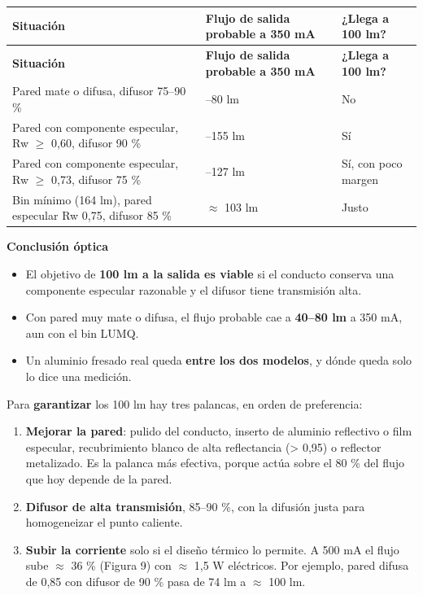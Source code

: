 \documentclass[11pt,a4paper]{article}
\newenvironment{notainferencia}[1]
  {\begin{notainferenciabase}{\sffamily\scriptsize\bfseries\color{green}#1}\par\vspace{2pt}}
  {\end{notainferenciabase}}
\begin{document}
\begingroup\footnotesize
\setlength{\tabcolsep}{4pt}
\setlength{\emergencystretch}{4em}
 
\begin{longtable}{@{}>{\RaggedRight\arraybackslash}p{}>{\RaggedRight\arraybackslash}p{}>{\RaggedRight\arraybackslash}p{}@{}}
\toprule
\scriptsize\textbf{Situación} & \scriptsize\textbf{Flujo de salida probable a 350 mA} & \scriptsize\textbf{¿Llega a 100 lm?} \\
\midrule
\endfirsthead
\toprule
\scriptsize\textbf{Situación} & \scriptsize\textbf{Flujo de salida probable a 350 mA} & \scriptsize\textbf{¿Llega a 100 lm?} \\
\midrule
\endhead
\bottomrule
\endfoot
Pared mate o difusa, difusor 75–90 \% & 40–80 lm & No \\
Pared con componente especular, Rw $\geq$ 0,60, difusor 90 \% & 100–155 lm & Sí \\
Pared con componente especular, Rw $\geq$ 0,73, difusor 75 \% & 100–127 lm & Sí, con poco margen \\
Bin mínimo (164 lm), pared especular Rw 0,75, difusor 85 \% & $\approx$ 103 lm & Justo \\
\end{longtable}
\endgroup

\begin{notainferencia}{Conclusión óptica}
\begin{itemize}
\item El objetivo de \textbf{100 lm a la salida es viable} si el conducto conserva una componente especular razonable y el difusor tiene transmisión alta.
\item Con pared muy mate o difusa, el flujo probable cae a \textbf{40–80 lm} a 350 mA, aun con el bin LUMQ.
\item Un aluminio fresado real queda \textbf{entre los dos modelos}, y dónde queda solo lo dice una medición.
\end{itemize}

\end{notainferencia}
Para \textbf{garantizar} los 100 lm hay tres palancas, en orden de preferencia:

\begin{enumerate}
\item \textbf{Mejorar la pared}: pulido del conducto, inserto de aluminio reflectivo o film especular, recubrimiento blanco de alta reflectancia (\textgreater{} 0,95) o reflector metalizado. Es la palanca más efectiva, porque actúa sobre el 80 \% del flujo que hoy depende de la pared.
\item \textbf{Difusor de alta transmisión}, 85–90 \%, con la difusión justa para homogeneizar el punto caliente.
\item \textbf{Subir la corriente} solo si el diseño térmico lo permite. A 500 mA el flujo sube $\approx$ 36 \% (Figura 9) con $\approx$ 1,5 W eléctricos. Por ejemplo, pared difusa de 0,85 con difusor de 90 \% pasa de 74 lm a $\approx$ 100 lm.
\end{enumerate}
\end{document}
